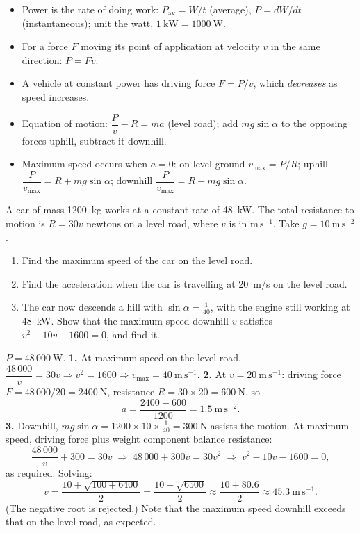 \documentclass[11pt]{article}
\begin{document}
\begin{aretenir}
\begin{itemize}
\item Power is the rate of doing work: $P_{\text{av}} = W/t$ (average), $P = dW/dt$ (instantaneous); unit the watt, $1\ \mathrm{kW} = 1000\ \mathrm{W}$.
\item For a force $F$ moving its point of application at velocity $v$ in the same direction: $P = Fv$.
\item A vehicle at constant power has driving force $F = P/v$, which \emph{decreases} as speed increases.
\item Equation of motion: $\dfrac{P}{v} - R = ma$ (level road); add $mg\sin\alpha$ to the opposing forces uphill, subtract it downhill.
\item Maximum speed occurs when $a = 0$: on level ground $v_{\max} = P/R$; uphill $\dfrac{P}{v_{\max}} = R + mg\sin\alpha$; downhill $\dfrac{P}{v_{\max}} = R - mg\sin\alpha$.
\end{itemize}
\end{aretenir}

\begin{exercice}
A car of mass \SI{1200}{kg} works at a constant rate of \SI{48}{kW}. The total resistance to motion is $R = 30v$ newtons on a level road, where $v$ is in $\mathrm{m\,s^{-1}}$. Take $g = 10\ \mathrm{m\,s^{-2}}$.
\begin{enumerate}
\item Find the maximum speed of the car on the level road.
\item Find the acceleration when the car is travelling at \SI{20}{m/s} on the level road.
\item The car now descends a hill with $\sin\alpha = \tfrac{1}{40}$, with the engine still working at \SI{48}{kW}. Show that the maximum speed downhill $v$ satisfies $v^2 - 10v - 1600 = 0$, and find it.
\end{enumerate}
\end{exercice}

\begin{corrige}[Exercise 1]
$P = 48\,000\ \mathrm{W}$.
\textbf{1.} At maximum speed on the level road, $\dfrac{48\,000}{v} = 30v \Rightarrow v^2 = 1600 \Rightarrow v_{\max} = 40\ \mathrm{m\,s^{-1}}$.
\textbf{2.} At $v = 20\ \mathrm{m\,s^{-1}}$: driving force $F = 48\,000/20 = 2400\ \mathrm{N}$, resistance $R = 30 \times 20 = 600\ \mathrm{N}$, so
\[
a = \frac{2400 - 600}{1200} = 1.5\ \mathrm{m\,s^{-2}}.
\]
\textbf{3.} Downhill, $mg\sin\alpha = 1200 \times 10 \times \tfrac{1}{40} = 300\ \mathrm{N}$ assists the motion. At maximum speed, driving force plus weight component balance resistance:
\[
\frac{48\,000}{v} + 300 = 30v
\;\Longrightarrow\;
48\,000 + 300v = 30v^2
\;\Longrightarrow\;
v^2 - 10v - 1600 = 0,
\]
as required. Solving:
\[
v = \frac{10 + \sqrt{100 + 6400}}{2} = \frac{10 + \sqrt{6500}}{2} \approx \frac{10 + 80.6}{2} \approx 45.3\ \mathrm{m\,s^{-1}}.
\]
(The negative root is rejected.) Note that the maximum speed downhill exceeds that on the level road, as expected.
\end{corrige}
\end{document}
